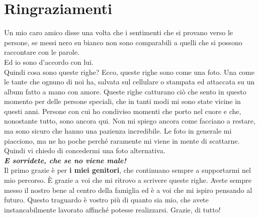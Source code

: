 
\chapter{Ringraziamenti} %

\label{Ringraziamenti} %
 
 
 Un mio caro amico disse una volta che i sentimenti che si provano verso le persone, se messi nero su bianco non sono comparabili a quelli che si possono raccontare con le parole.\\

Ed io sono d'accordo con lui.\\

Quindi cosa sono queste righe? Ecco, queste righe sono come una foto. Una come le tante che ognuno di noi ha, salvata sul cellulare o stampata ed attaccata su un album fatto a mano con amore.
Queste righe catturano ciò che sento in questo momento per delle persone speciali, che in tanti modi mi sono state vicine in questi anni. Persone con cui ho condiviso momenti che porto nel cuore e che, nonostante tutto, sono ancora qui.
Non mi spiego ancora come facciano a restare, ma sono sicuro che hanno una pazienza incredibile.
Le foto in generale mi piacciono, ma ne ho poche perché raramente mi viene in mente di scattarne.
Quindi vi chiedo di concedermi una foto alternativa.\\

\emph{\textbf{E sorridete, che se no viene male!}}\\



Il primo grazie è per \textbf{i miei genitori}, che continuano sempre a supportarmi nel mio percorso. È grazie a voi che mi ritrovo a scrivere queste righe. Avete sempre messo il nostro bene al centro della famiglia ed è a voi che mi ispiro pensando al futuro. Questo traguardo è vostro più di quanto sia mio, che avete instancabilmente lavorato affinché potesse realizzarsi. Grazie, di tutto!\\

